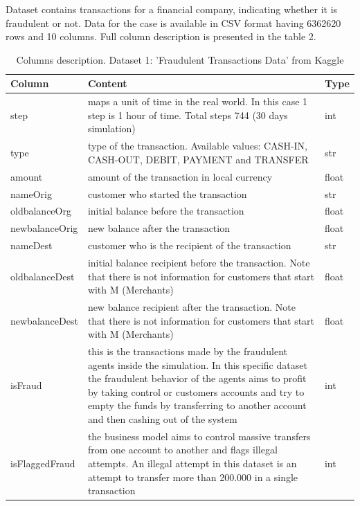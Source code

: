 \documentclass[12pt,a4paper, hidelinks]{article}
\begin{document}
Dataset contains transactions for a financial company, indicating whether it is fraudulent or not. Data for the case is available in CSV format having 6362620 rows and 10 columns. Full column description is presented in the table 2.

\begin{table}[ht!]
\centering
\begin{tabular}{|p{3cm}|p{9.8cm}|p{2cm}|}
\hline
\textbf{Column} & \textbf{Content} & \textbf{Type} \\
\hline
step & maps a unit of time in the real world. In this case 1 step is 1 hour of time. Total steps 744 (30 days simulation) & int \\
\hline
type & type of the transaction. Available values: CASH-IN, CASH-OUT, DEBIT, PAYMENT and TRANSFER & str \\
\hline
amount & amount of the transaction in local currency & float \\
\hline
nameOrig & customer who started the transaction & str \\
\hline
oldbalanceOrg & initial balance before the transaction & float \\
\hline
newbalanceOrig & new balance after the transaction & float \\
\hline
nameDest & customer who is the recipient of the transaction & str \\
\hline
oldbalanceDest & initial balance recipient before the transaction. Note that there is not information for customers that start with M (Merchants) & float \\
\hline
newbalanceDest & new balance recipient after the transaction. Note that there is not information for customers that start with M (Merchants) & float \\
\hline
isFraud & this is the transactions made by the fraudulent agents inside the simulation. In this specific dataset the fraudulent behavior of the agents aims to profit by taking control or customers accounts and try to empty the funds by transferring to another account and then cashing out of the system & int \\
\hline
isFlaggedFraud & the business model aims to control massive transfers from one account to another and flags illegal attempts. An illegal attempt in this dataset is an attempt to transfer more than 200.000 in a single transaction & int \\
\hline
\end{tabular}
\caption{Columns description. Dataset 1: 'Fraudulent Transactions Data' from Kaggle}
\end{table}
\end{document}
